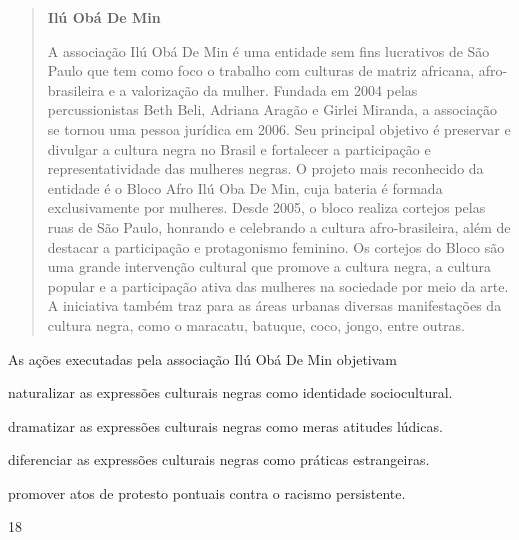 \begin{quote}
\textbf{Ilú Obá De Min}

A associação Ilú Obá De Min é uma entidade sem fins lucrativos de São Paulo que tem como foco o trabalho com culturas de matriz africana, afro-brasileira e a valorização da mulher. Fundada em 2004 pelas percussionistas Beth Beli, Adriana Aragão e Girlei Miranda, a associação se tornou uma pessoa jurídica em 2006. Seu principal objetivo é preservar e divulgar a cultura negra no Brasil e fortalecer a participação e representatividade das mulheres negras. O projeto mais reconhecido da entidade é o Bloco Afro Ilú Oba De Min, cuja bateria é formada exclusivamente por mulheres. Desde 2005, o bloco realiza cortejos pelas ruas de São Paulo, honrando e celebrando a cultura afro-brasileira, além de destacar a participação e protagonismo feminino. Os cortejos do Bloco são uma grande intervenção cultural que promove a cultura negra, a cultura popular e a participação ativa das mulheres na sociedade por meio da arte. A iniciativa também traz para as áreas urbanas diversas manifestações da cultura negra, como o maracatu, batuque, coco, jongo, entre outras.

\end{quote}

As ações executadas pela associação Ilú Obá De Min objetivam

\begin{escolha}
\item  naturalizar as expressões culturais negras como identidade
    sociocultural.
\item  dramatizar as expressões culturais negras como meras atitudes
    lúdicas.
\item  diferenciar as expressões culturais negras como práticas
    estrangeiras.
\item  promover atos de protesto pontuais contra o racismo persistente.
\end{escolha}

\num{18}

